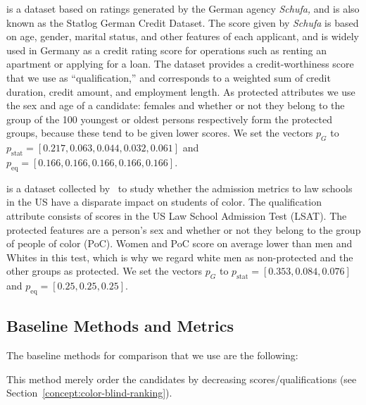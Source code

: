  is a dataset based on ratings generated by the German agency \emph{Schufa,} and is also known as the Statlog German Credit Dataset.
%
The score given by \emph{Schufa} is based on age, gender, marital status, and other features of each applicant, and is widely used in Germany as a credit rating score for operations such as renting an apartment or applying for a loan.
%
The dataset provides a credit-worthiness score that we use as ``qualification,'' and corresponds to a weighted sum of credit duration, credit amount, and employment length.
%
As protected attributes we use the sex and age of a candidate: females and whether or not they belong to the group of the 100 youngest or oldest persons respectively form the protected groups, because these tend to be given lower scores.
%
We set the vectors $p_G$ to $p_{\text{stat}}=[0.217,0.063,0.044,0.032,0.061]$ and $p_{\text{eq}}=[0.166,0.166,0.166,0.166,0.166]$.


 is a dataset collected by~\citet{wightman1998lsac} to study whether the admission metrics to law schools in the US have a disparate impact on students of color.
%
The qualification attribute consists of scores in the US Law School Admission Test (LSAT).
%
The protected features are a person's sex and whether or not they belong to the group of people of color (PoC).
%
Women and PoC score on average lower than men and Whites in this test, which is why we regard white men as non-protected and the other groups as protected.
%
We set the vectors $p_G$ to $p_{\text{stat}}=[0.353,0.084,0.076]$ and $p_{\text{eq}}=[0.25,0.25,0.25]$.


\subsection{Baseline Methods and Metrics}\label{sec:experiments-baselines}

The baseline methods for comparison that we use are the following:

 This method merely order the candidates by decreasing scores/qualifications (see Section~\ref{concept:color-blind-ranking}).

